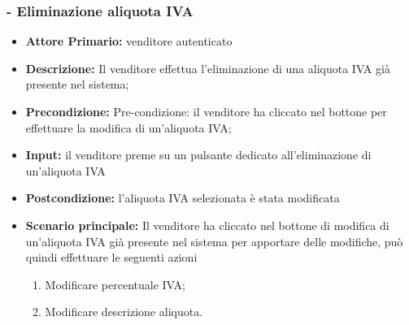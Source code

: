 \stepsubUserCase
\subsubsection{- Eliminazione aliquota IVA}
\begin{itemize}
    \item \textbf{Attore Primario:}  venditore autenticato
    \item \textbf{Descrizione:} Il venditore effettua l'eliminazione di una aliquota IVA già presente nel sistema;
    \item \textbf{Precondizione:} Pre-condizione: il venditore ha cliccato nel bottone per effettuare la modifica di un’aliquota IVA;
    \item \textbf{Input:} il venditore preme su un pulsante dedicato all'eliminazione di un'aliquota IVA
    \item \textbf{Postcondizione:} l'aliquota IVA selezionata è stata modificata
    \item \textbf{Scenario principale:} Il venditore ha cliccato nel bottone di modifica di un’aliquota IVA già presente nel sistema per apportare delle modifiche, può quindi effettuare le seguenti azioni
    \begin{enumerate}
        \item Modificare percentuale IVA;
        \item Modificare descrizione aliquota.
    \end{enumerate}
\end{itemize}

\stepUserCase
